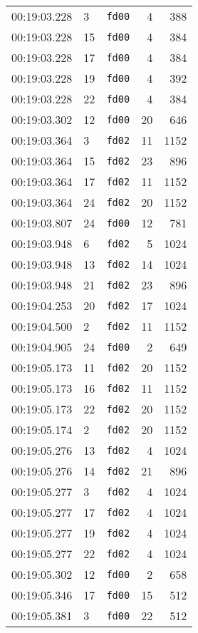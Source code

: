 \documentclass{article}
\begin{document}
\begin{longtable}{lllrr}
00:19:03.228 & 3 & \texttt{fd00} & 4 & 388 \\
00:19:03.228 & 15 & \texttt{fd00} & 4 & 384 \\
00:19:03.228 & 17 & \texttt{fd00} & 4 & 384 \\
00:19:03.228 & 19 & \texttt{fd00} & 4 & 392 \\
00:19:03.228 & 22 & \texttt{fd00} & 4 & 384 \\
00:19:03.302 & 12 & \texttt{fd00} & 20 & 646 \\
00:19:03.364 & 3 & \texttt{fd02} & 11 & 1152 \\
00:19:03.364 & 15 & \texttt{fd02} & 23 & 896 \\
00:19:03.364 & 17 & \texttt{fd02} & 11 & 1152 \\
00:19:03.364 & 24 & \texttt{fd02} & 20 & 1152 \\
00:19:03.807 & 24 & \texttt{fd00} & 12 & 781 \\
00:19:03.948 & 6 & \texttt{fd02} & 5 & 1024 \\
00:19:03.948 & 13 & \texttt{fd02} & 14 & 1024 \\
00:19:03.948 & 21 & \texttt{fd02} & 23 & 896 \\
00:19:04.253 & 20 & \texttt{fd02} & 17 & 1024 \\
00:19:04.500 & 2 & \texttt{fd02} & 11 & 1152 \\
00:19:04.905 & 24 & \texttt{fd00} & 2 & 649 \\
00:19:05.173 & 11 & \texttt{fd02} & 20 & 1152 \\
00:19:05.173 & 16 & \texttt{fd02} & 11 & 1152 \\
00:19:05.173 & 22 & \texttt{fd02} & 20 & 1152 \\
00:19:05.174 & 2 & \texttt{fd02} & 20 & 1152 \\
00:19:05.276 & 13 & \texttt{fd02} & 4 & 1024 \\
00:19:05.276 & 14 & \texttt{fd02} & 21 & 896 \\
00:19:05.277 & 3 & \texttt{fd02} & 4 & 1024 \\
00:19:05.277 & 17 & \texttt{fd02} & 4 & 1024 \\
00:19:05.277 & 19 & \texttt{fd02} & 4 & 1024 \\
00:19:05.277 & 22 & \texttt{fd02} & 4 & 1024 \\
00:19:05.302 & 12 & \texttt{fd00} & 2 & 658 \\
00:19:05.346 & 17 & \texttt{fd00} & 15 & 512 \\
00:19:05.381 & 3 & \texttt{fd00} & 22 & 512 \\

\end{longtable}
\end{document}
